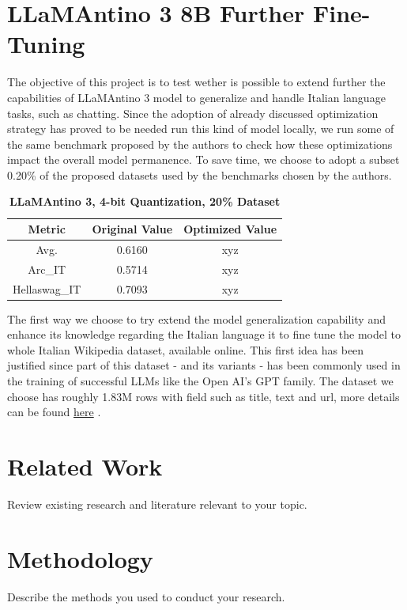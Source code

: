 \documentclass{article}
\begin{document}
	\section{LLaMAntino 3 8B Further Fine-Tuning}
	The objective of this project is to test wether is possible to extend further the capabilities of LLaMAntino 3 model to generalize and handle Italian language tasks, such as chatting.
	Since the adoption of already discussed optimization strategy has proved to be needed run this kind of model locally, we run some of the same benchmark proposed by the authors to check how these optimizations impact the overall model permanence.   
	To save time, we choose to adopt a subset 0.20\% of the proposed datasets used by the benchmarks chosen by the authors.  
	\begin{table}[h]
		\center
		\begin{tabular}{ccc}
			\toprule
			\textbf{Metric} & \textbf{Original Value} & \textbf{Optimized Value} \\
			\midrule
			Avg. & 0.6160 & xyz \\
			Arc\_IT & 0.5714 & xyz \\
			Hellaswag\_IT &	0.7093 & xyz \\
			\bottomrule
		\end{tabular}
		\caption{\textbf{LLaMAntino 3, 4-bit Quantization, 20\% Dataset}}
	\end{table}
	The first way we choose to try extend the model generalization capability and enhance its knowledge regarding the Italian language it to fine tune the model to whole Italian Wikipedia dataset, available online. 
	This first idea has been justified since part of this dataset - and its variants - has been commonly used in the training of successful LLMs like the Open AI's GPT family. The dataset we choose has roughly 1.83M rows with field such as title, text and url, more details can be found \href{https://huggingface.co/datasets/wikimedia/wikipedia/viewer/20231101.it}{here} . 
	   
	
	
	
		
	\section{Related Work}
	Review existing research and literature relevant to your topic.
	
	\section{Methodology}
	Describe the methods you used to conduct your research.
	
\end{document}
